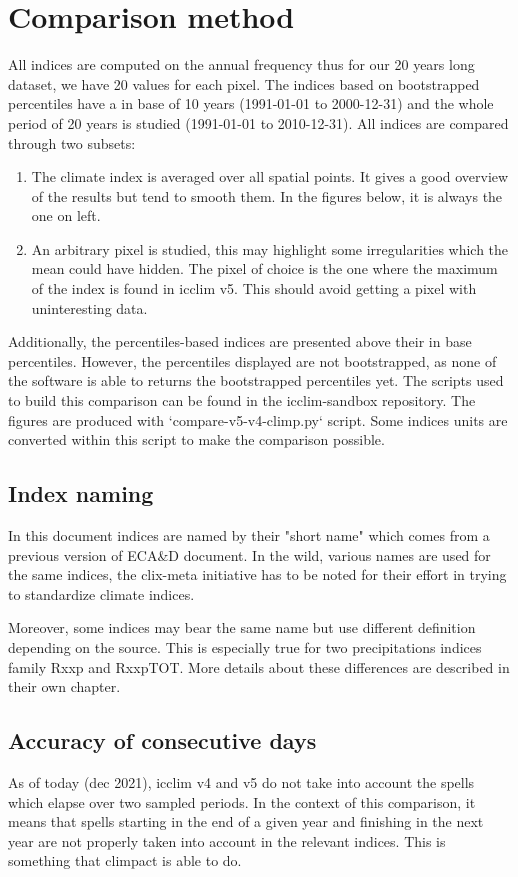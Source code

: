 \documentclass[a4paper,11pt]{article}
\begin{document}
\section{Comparison method}
    All indices are computed on the annual frequency thus for our 20 years long dataset, we have 20 values for each pixel.
    The indices based on bootstrapped percentiles have a in base of 10 years (1991-01-01 to 2000-12-31) and the whole period of 20 years is studied (1991-01-01 to 2010-12-31).
    All indices are compared through two subsets: 
    \begin{enumerate}
        \item The climate index is averaged over all spatial points. 
        It gives a good overview of the results but tend to smooth them. In the figures below, it is always the one on left.
        \item An arbitrary pixel is studied, this may highlight some irregularities which the mean could have hidden. The pixel of choice is the one where the maximum of the index is found in icclim v5. This should avoid getting a pixel with uninteresting data.
    \end{enumerate}
    Additionally, the percentiles-based indices are presented above their in base percentiles. However, the percentiles displayed are not bootstrapped, as none of the software is able to returns the bootstrapped percentiles yet.
    The scripts used to build this comparison can be found in the icclim-sandbox repository\cite{gh/icclim_sandbox}.
    The figures are produced with `compare-v5-v4-climp.py` script.
    Some indices units are converted within this script to make the comparison possible.

\subsection{Index naming}
    In this document indices are named by their "short name" which comes from a previous version of ECA\&D document\cite{doc/ecad_old}.
    In the wild, various names are used for the same indices, the clix-meta\cite{gh/clixmeta} initiative has to be noted for their effort in trying to standardize climate indices.

    Moreover, some indices may bear the same name but use different definition depending on the source. This is especially true for two precipitations indices family Rxxp and RxxpTOT.
    More details about these differences are described in their own chapter.
\subsection{Accuracy of consecutive days}
    As of today (dec 2021), icclim v4 and v5 do not take into account the spells which elapse over two sampled periods. In the context of this comparison, it means that spells starting in the end of a given year and finishing in the next year are not properly taken into account in the relevant indices.
    This is something that climpact is able to do.
\end{document}
